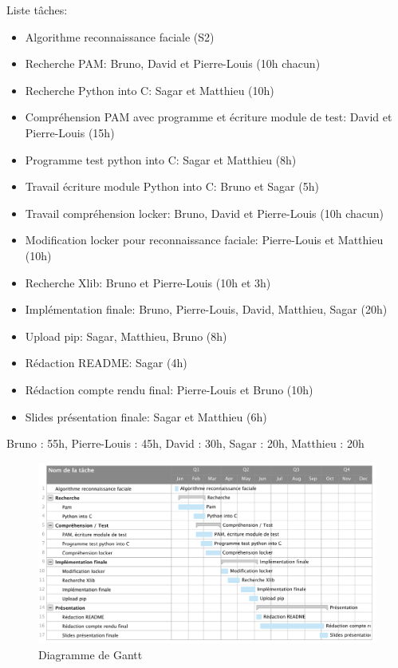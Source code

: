 \documentclass[french]{report}
\begin{document}
Liste tâches:
  \begin{itemize}[label=\textbullet, font=\normalfont \color{blue}]
  \item{Algorithme reconnaissance faciale (S2)}
  \item{Recherche PAM: Bruno, David et Pierre-Louis (10h chacun)}
  \item{Recherche Python into C: Sagar et Matthieu (10h)}
  \item{Compréhension PAM avec programme et écriture module de test: David et
  Pierre-Louis (15h)}
  \item{Programme test python into C: Sagar et Matthieu (8h)}
  \item{Travail écriture module Python into C: Bruno et Sagar (5h)}
  \item{Travail compréhension locker: Bruno, David et Pierre-Louis (10h chacun)}
  \item{Modification locker pour reconnaissance faciale: Pierre-Louis et Matthieu (10h)}
  \item{Recherche Xlib: Bruno et Pierre-Louis (10h et 3h)}
  \item{Implémentation finale: Bruno, Pierre-Louis, David, Matthieu, Sagar (20h)}
  \item{Upload pip: Sagar, Matthieu, Bruno (8h)}
  \item{Rédaction README: Sagar (4h)}
  \item{Rédaction compte rendu final: Pierre-Louis et Bruno (10h)}
  \item{Slides présentation finale: Sagar et Matthieu (6h)}
\end{itemize}

\vspace{0.5cm}
Bruno : 55h, Pierre-Louis : 45h, David : 30h, Sagar : 20h, Matthieu : 20h

\begin{figure}[h]\label{fig:gantt2}
  \includegraphics[width=\linewidth]{gantt2}
  \caption{Diagramme de Gantt}
  \label{fig:gantt2}
\end{figure}
\end{document}
